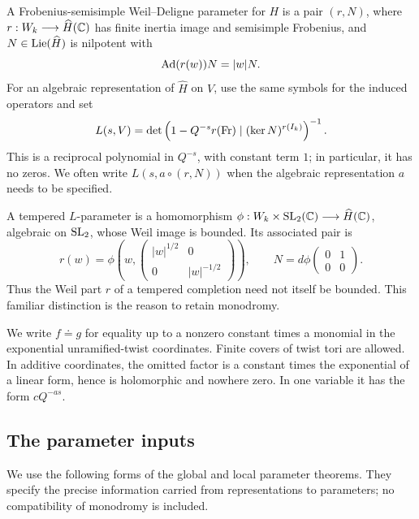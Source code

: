 A Frobenius-semisimple Weil--Deligne parameter for $H$ is a pair $(r,N)$,
where $r:W_k\longrightarrow\widehat H(\mathbb C)$ has finite inertia image and
semisimple Frobenius, and $N\in\operatorname{Lie}(\widehat H)$ is nilpotent with
\begin{equation}\label{eq:wd-relation}
 \operatorname{Ad}(r(w))N=|w|N.
\end{equation}
For an algebraic representation of $\widehat H$ on $V$, use the same
symbols for the induced operators and set
\begin{equation}\label{eq:local-factor}
 L(s,V)=\det\left(1-Q^{-s}r(\operatorname{Fr})\mid(\ker N)^{r(I_k)}\right)^{-1}.
\end{equation}
This is a reciprocal polynomial in $Q^{-s}$, with constant term $1$;
in particular, it has no zeros. We often write $L(s,a\circ(r,N))$ when
the algebraic representation $a$ needs to be specified.

A tempered $L$-parameter is a homomorphism
$\phi:W_k\times\mathrm{SL}_2(\mathbb C)\longrightarrow\widehat H(\mathbb C)$, algebraic on
$\mathrm{SL}_2$, whose Weil image is bounded. Its associated pair is
\begin{equation}\label{eq:completion}
 r(w)=\phi\left(w,
       \begin{pmatrix}|w|^{1/2}&0\\0&|w|^{-1/2}\end{pmatrix}\right),
 \qquad
 N=d\phi\begin{pmatrix}0&1\\0&0\end{pmatrix}.
\end{equation}
Thus the Weil part $r$ of a tempered completion need not itself be
bounded. This familiar distinction is the reason to retain monodromy.

We write $f\doteq g$ for equality up to a nonzero constant times a
monomial in the exponential unramified-twist coordinates. Finite covers
of twist tori are allowed. In additive coordinates, the omitted factor
is a constant times the exponential of a linear form, hence is
holomorphic and nowhere zero. In one variable it has the form $cQ^{-as}$.

\subsection{The parameter inputs}

We use the following forms of the global and local parameter theorems.
They specify the precise information carried from representations to
parameters; no compatibility of monodromy is included.

